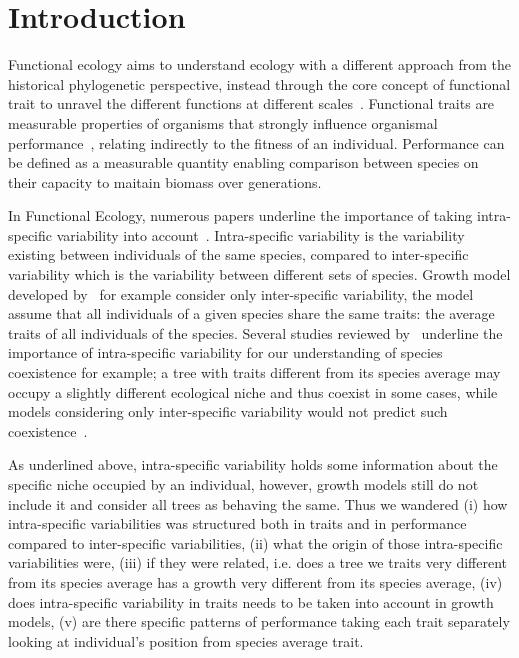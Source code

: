 \label{sec:Intro}
\section*{Introduction}
Functional ecology aims to understand ecology with a different approach from the historical phylogenetic perspective, instead through the core concept of functional trait to unravel the different functions at different scales~\citep{mcgill_rebuilding_2006}. Functional traits are measurable properties of organisms that strongly influence organismal performance~\citep{mcgill_rebuilding_2006}, relating indirectly to the fitness of an individual. Performance can be defined as a measurable quantity enabling comparison between species on their capacity to maitain biomass over generations.

In Functional Ecology, numerous papers underline the importance of taking intra-specific variability into account~\citep{violle_towards_2009, albert_when_2011}. Intra-specific variability is the variability existing between individuals of the same species, compared to inter-specific variability which is the variability between different sets of species. Growth model developed by~\citet{herault_functional_2011} for example consider only inter-specific variability, the model assume that all individuals of a given species share the same traits: the average traits of all individuals of the species. Several studies reviewed by~\citet{violle_return_2012} underline the importance of intra-specific variability for our understanding of species coexistence for example; a tree with traits different from its species average may occupy a slightly different ecological niche and thus coexist in some cases, while models considering only inter-specific variability would not predict such coexistence~\citep{clark_high-dimensional_2010, paine_functional_2011}.

As underlined above, intra-specific variability holds some information about the specific niche occupied by an individual, however, growth models still do not include it and consider all trees as behaving the same. Thus we wandered (i) how intra-specific variabilities was structured both in traits and in performance compared to inter-specific variabilities, (ii) what the origin of those intra-specific variabilities were, (iii) if they were related, i.e. does a tree we traits very different from its species average has a growth very different from its species average, (iv) does intra-specific variability in traits needs to be taken into account in growth models, (v) are there specific patterns of performance taking each trait separately looking at individual's position from species average trait.

